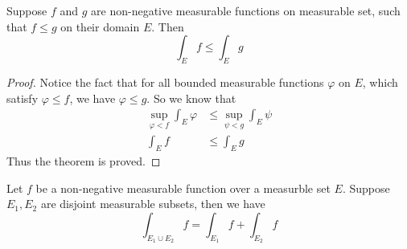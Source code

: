 \documentclass[lang=en, 12pt]{elegantbook}
\begin{document}
            \begin{theorem}[Monotonicity]
                Suppose $f$ and $g$ are non-negative measurable functions on measurable set, such that $ f \leq g$ on their domain $E$.
            Then
            $$\int_E f \leq \int_E g$$
            \end{theorem}
            \begin{proof}
                Notice the fact that for all bounded measurable functions $\varphi$ on $E$, which satisfy $\varphi \leq f$, we have
            $\varphi \leq g$. So we know that 
                \begin{equation*}
                    \begin{aligned}
                        \sup_{\varphi <f} \int_E \varphi &\leq \sup_{\psi <g} \int_E \psi\\ 
                        \int_E f &\leq \int_E g 
                    \end{aligned}
                \end{equation*}
                Thus the theorem is proved.
            \end{proof}
            \begin{theorem}
                Let $f$ be a non-negative measurable function over a measurble set $E$. Suppose $E_1, E_2$ are disjoint measurable subsets,
            then we have
            $$\int_{E_1 \cup E_2 }f = \int_{E_1} f + \int_{E_2} f$$            
            \end{theorem}
\end{document}
